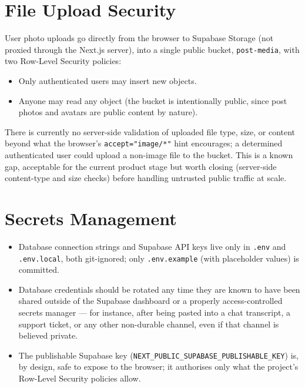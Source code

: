 \documentclass[11pt,a4paper]{article}
\begin{document}
\section{File Upload Security}
User photo uploads go directly from the browser to Supabase Storage (not proxied
through the Next.js server), into a single public bucket, \texttt{post-media}, with two
Row-Level Security policies:
\begin{itemize}[leftmargin=*]
  \item Only authenticated users may insert new objects.
  \item Anyone may read any object (the bucket is intentionally public, since post
        photos and avatars are public content by nature).
\end{itemize}
There is currently no server-side validation of uploaded file type, size, or content
beyond what the browser's \texttt{accept="image/*"} hint encourages; a determined
authenticated user could upload a non-image file to the bucket. This is a known gap,
acceptable for the current product stage but worth closing (server-side content-type
and size checks) before handling untrusted public traffic at scale.

\section{Secrets Management}
\begin{itemize}[leftmargin=*]
  \item Database connection strings and Supabase API keys live only in \texttt{.env}
        and \texttt{.env.local}, both git-ignored; only \texttt{.env.example} (with
        placeholder values) is committed.
  \item Database credentials should be rotated any time they are known to have been
        shared outside of the Supabase dashboard or a properly access-controlled
        secrets manager --- for instance, after being pasted into a chat transcript,
        a support ticket, or any other non-durable channel, even if that channel is
        believed private.
  \item The publishable Supabase key (\texttt{NEXT\_PUBLIC\_SUPABASE\_PUBLISHABLE\_KEY})
        is, by design, safe to expose to the browser; it authorises only what the
        project's Row-Level Security policies allow.
\end{itemize}
\end{document}
